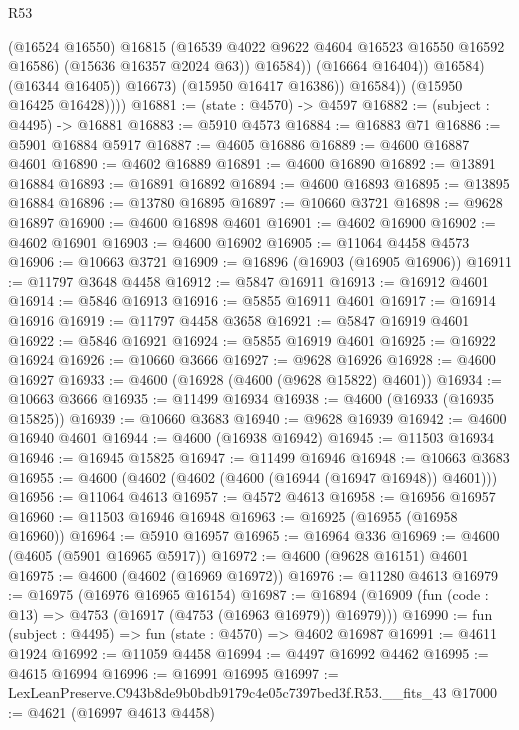 \begin{lexlean}{R53}
\begin{coremodule}
                              (@16524 @16550)
                              @16815
                              (@16539 @4022 @9622 @4604 @16523 @16550 @16592 @16586)
                              (@15636 @16357 @2024 @63))
                            @16584))
                        (@16664 @16404))
                      @16584)
                    (@16344 @16405))
                  @16673)
                (@15950 @16417 @16386))
              @16584))
          (@15950 @16425 @16428))))
@16881 := (state : @4570) -> @4597
@16882 := (subject : @4495) -> @16881
@16883 := @5910 @4573
@16884 := @16883 @71
@16886 := @5901 @16884 @5917
@16887 := @4605 @16886
@16889 := @4600 @16887 @4601
@16890 := @4602 @16889
@16891 := @4600 @16890
@16892 := @13891 @16884
@16893 := @16891 @16892
@16894 := @4600 @16893
@16895 := @13895 @16884
@16896 := @13780 @16895
@16897 := @10660 @3721
@16898 := @9628 @16897
@16900 := @4600 @16898 @4601
@16901 := @4602 @16900
@16902 := @4602 @16901
@16903 := @4600 @16902
@16905 := @11064 @4458 @4573
@16906 := @10663 @3721
@16909 := @16896 (@16903 (@16905 @16906))
@16911 := @11797 @3648 @4458
@16912 := @5847 @16911
@16913 := @16912 @4601
@16914 := @5846 @16913
@16916 := @5855 @16911 @4601
@16917 := @16914 @16916
@16919 := @11797 @4458 @3658
@16921 := @5847 @16919 @4601
@16922 := @5846 @16921
@16924 := @5855 @16919 @4601
@16925 := @16922 @16924
@16926 := @10660 @3666
@16927 := @9628 @16926
@16928 := @4600 @16927
@16933 := @4600 (@16928 (@4600 (@9628 @15822) @4601))
@16934 := @10663 @3666
@16935 := @11499 @16934
@16938 := @4600 (@16933 (@16935 @15825))
@16939 := @10660 @3683
@16940 := @9628 @16939
@16942 := @4600 @16940 @4601
@16944 := @4600 (@16938 @16942)
@16945 := @11503 @16934
@16946 := @16945 @15825
@16947 := @11499 @16946
@16948 := @10663 @3683
@16955 := @4600 (@4602 (@4602 (@4600 (@16944 (@16947 @16948)) @4601)))
@16956 := @11064 @4613
@16957 := @4572 @4613
@16958 := @16956 @16957
@16960 := @11503 @16946 @16948
@16963 := @16925 (@16955 (@16958 @16960))
@16964 := @5910 @16957
@16965 := @16964 @336
@16969 := @4600 (@4605 (@5901 @16965 @5917))
@16972 := @4600 (@9628 @16151) @4601
@16975 := @4600 (@4602 (@16969 @16972))
@16976 := @11280 @4613
@16979 := @16975 (@16976 @16965 @16154)
@16987 := @16894 (@16909 (fun (code : @13) => @4753 (@16917 (@4753 (@16963 @16979)) @16979)))
@16990 := fun (subject : @4495) => fun (state : @4570) => @4602 @16987
@16991 := @4611 @1924
@16992 := @11059 @4458
@16994 := @4497 @16992 @4462
@16995 := @4615 @16994
@16996 := @16991 @16995
@16997 := LexLeanPreserve.C943b8de9b0bdb9179c4e05c7397bed3f.R53.__fits_43
@17000 := @4621 (@16997 @4613 @4458)

\end{coremodule}
\end{lexlean}

